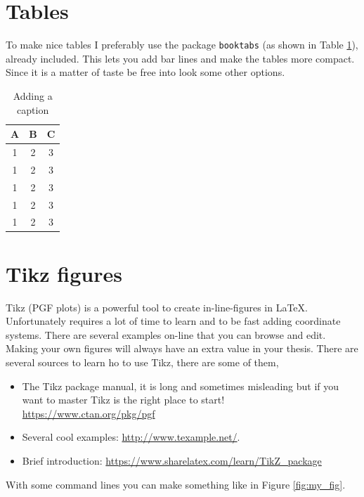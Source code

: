 \documentclass[../../main/thesis_msc.tex]{subfiles}
\begin{document}
    \section{Tables}
    To make nice tables I preferably use the package \texttt{booktabs} (as shown in Table \ref{tab:my_table}), already included. This lets you add bar lines and make the tables more compact. Since it is a matter of taste be free into look some other options.

    \begin{table}[t]
        \centering
        \begin{tabular}{ccc}
            \toprule
            \textbf{A} & \textbf{B} & \textbf{C} \\ \midrule
            1 & 2 & 3 \\
            1 & 2 & 3 \\
            1 & 2 & 3 \\
            1 & 2 & 3 \\
            1 & 2 & 3 \\
            \bottomrule
        \end{tabular}
        \caption{Adding a caption}
        \label{tab:my_table}
    \end{table}

    \section{Tikz figures}
    Tikz (PGF plots) is a powerful tool to create in-line-figures in \LaTeX. Unfortunately requires a lot of time to learn and to be fast adding coordinate systems. There are several examples on-line that you can browse and edit. Making your own figures will always have an extra value in your thesis. There are several sources to learn ho to use Tikz, there are some of them,

    \begin{itemize}
        \item The Tikz package manual, it is long and sometimes misleading but if you want to master Tikz is the right place to start!
        \url{https://www.ctan.org/pkg/pgf}
        \item Several cool examples: \url{http://www.texample.net/}.
        \item Brief introduction: \url{https://www.sharelatex.com/learn/TikZ_package}
    \end{itemize}

    With some command lines you can make something like in Figure \ref{fig:my_fig}.
\end{document}
